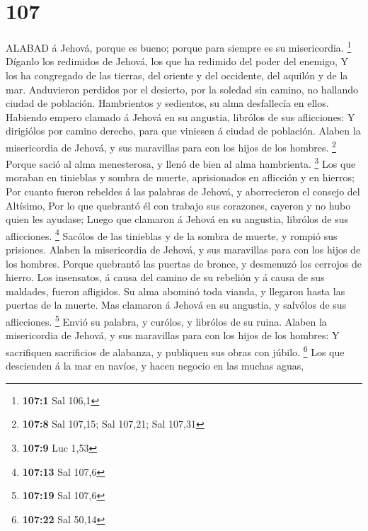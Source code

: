 \hypertarget{section-106}{%
\section{107}\label{section-106}}

 ALABAD á Jehová, porque es bueno; porque para siempre es su
misericordia. \footnote{\textbf{107:1} Sal 106,1}  Díganlo
los redimidos de Jehová, los que ha redimido del poder del enemigo,
 Y los ha congregado de las tierras, del oriente y del
occidente, del aquilón y de la mar.  Anduvieron perdidos por
el desierto, por la soledad sin camino, no hallando ciudad de población.
 Hambrientos y sedientos, su alma desfallecía en ellos.
 Habiendo empero clamado á Jehová en su angustia, librólos
de sus aflicciones:  Y dirigiólos por camino derecho, para
que viniesen á ciudad de población.  Alaben la misericordia
de Jehová, y sus maravillas para con los hijos de los hombres.
\footnote{\textbf{107:8} Sal 107,15; Sal 107,21; Sal 107,31}
 Porque sació al alma menesterosa, y llenó de bien al alma
hambrienta. \footnote{\textbf{107:9} Luc 1,53}  Los que
moraban en tinieblas y sombra de muerte, aprisionados en aflicción y en
hierros;  Por cuanto fueron rebeldes á las palabras de
Jehová, y aborrecieron el consejo del Altísimo,  Por lo que
quebrantó él con trabajo sus corazones, cayeron y no hubo quien les
ayudase;  Luego que clamaron á Jehová en su angustia,
librólos de sus aflicciones. \footnote{\textbf{107:13} Sal 107,6}
 Sacólos de las tinieblas y de la sombra de muerte, y
rompió sus prisiones.  Alaben la misericordia de Jehová, y
sus maravillas para con los hijos de los hombres.  Porque
quebrantó las puertas de bronce, y desmenuzó los cerrojos de hierro.
 Los insensatos, á causa del camino de su rebelión y á
causa de sus maldades, fueron afligidos.  Su alma abominó
toda vianda, y llegaron hasta las puertas de la muerte. 
Mas clamaron á Jehová en su angustia, y salvólos de sus aflicciones.
\footnote{\textbf{107:19} Sal 107,6}  Envió su palabra, y
curólos, y librólos de su ruina.  Alaben la misericordia de
Jehová, y sus maravillas para con los hijos de los hombres:
 Y sacrifiquen sacrificios de alabanza, y publiquen sus
obras con júbilo. \footnote{\textbf{107:22} Sal 50,14}  Los
que descienden á la mar en navíos, y hacen negocio en las muchas aguas,
